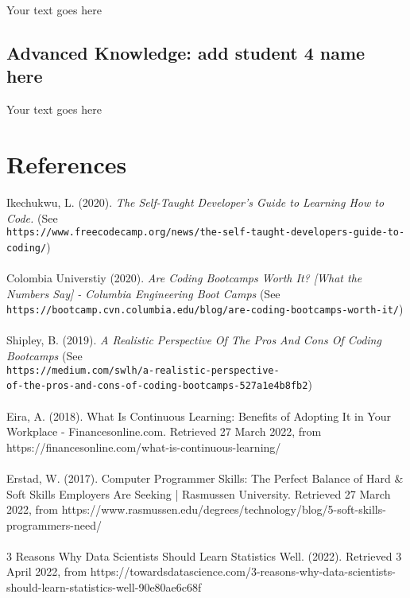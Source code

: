 \documentclass[a4paper, 11pt]{report}
\begin{document}
	Your text goes here
	
	\subsection{Advanced Knowledge: add student 4 name here}
	
	Your text goes here
	
	
	
	
	\newpage
	
	
	
	\section{References}
	Ikechukwu, L. (2020). \textit{The Self-Taught Developer's Guide to Learning How to Code.} (See\\ \texttt{https://www.freecodecamp.org/news/the-self-taught-developers-guide-to-coding/})
	\\
	\\
	Colombia Universtiy (2020). \textit{Are Coding Bootcamps Worth It? [What the Numbers Say] - Columbia Engineering Boot Camps} (See\\ \texttt{https://bootcamp.cvn.columbia.edu/blog/are-coding-bootcamps-worth-it/}) 
	\\
	\\
	Shipley, B. (2019). \textit{A Realistic Perspective Of The Pros And Cons Of Coding Bootcamps} (See\\ \texttt{https://medium.com/swlh/a-realistic-perspective-\\
		of-the-pros-and-cons-of-coding-bootcamps-527a1e4b8fb2}) 
	\\
	\\
	Eira, A. (2018). What Is Continuous Learning: Benefits of Adopting It in Your Workplace - Financesonline.com. Retrieved 27 March 2022, from https://financesonline.com/what-is-continuous-learning/
	\\
	\\
	Erstad, W. (2017). Computer Programmer Skills: The Perfect Balance of Hard \& Soft Skills Employers Are Seeking | Rasmussen University. Retrieved 27 March 2022, from https://www.rasmussen.edu/degrees/technology/blog/5-soft-skills-programmers-need/
	\\
	\\
	3 Reasons Why Data Scientists Should Learn Statistics Well. (2022). Retrieved 3 April 2022, from https://towardsdatascience.com/3-reasons-why-data-scientists-should-learn-statistics-well-90e80ae6c68f
\end{document}
